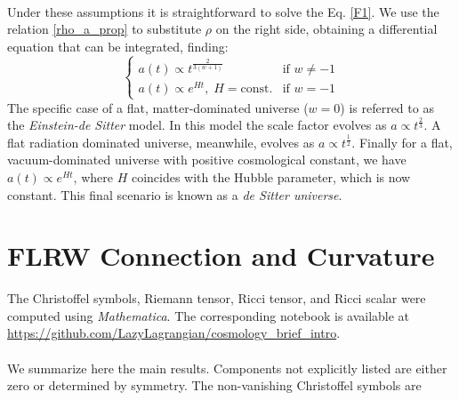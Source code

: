 \documentclass[12pt,letterpaper]{article}         %
\newcommand\para{\paragraph{}}
\begin{document}
\para
Under these assumptions it is straightforward to solve the Eq. \eqref{F1}. We use the relation \eqref{rho_a_prop} to substitute $\rho$ on the right side, obtaining a differential equation that can be integrated, finding: \begin{equation}
    \begin{cases} 
    a(t) \propto t^{\frac{2}{3(w+1)}} & \text{if } w \neq -1 \\
    a(t) \propto e^{Ht}, \; H = \text{const.} & \text{if } w = -1
\end{cases}
    \label{solF}
\end{equation}
The specific case of a flat, matter-dominated universe ($w = 0$) is referred to as the \emph{Einstein-de Sitter} model. In this model the scale factor evolves as $a \propto t^{\frac{2}{3}}$. A flat radiation dominated universe, meanwhile, evolves as $a \propto t^{\frac{1}{2}}$. Finally for a flat, vacuum-dominated universe with positive cosmological constant, we have $a(t) \propto e^{Ht}$, where $H$ coincides with the Hubble parameter, which is now constant. This final scenario is known as a \emph{de Sitter universe}.
\newpage
\appendix

\section{FLRW Connection and Curvature}
\label{appA}
The Christoffel symbols, Riemann tensor, Ricci tensor, and Ricci scalar were computed using \emph{Mathematica}. The corresponding notebook is available at \url{https://github.com/LazyLagrangian/cosmology_brief_intro}.
\para
We summarize here the main results. Components not explicitly listed are either zero or determined by symmetry. The non-vanishing Christoffel symbols are
\end{document}
